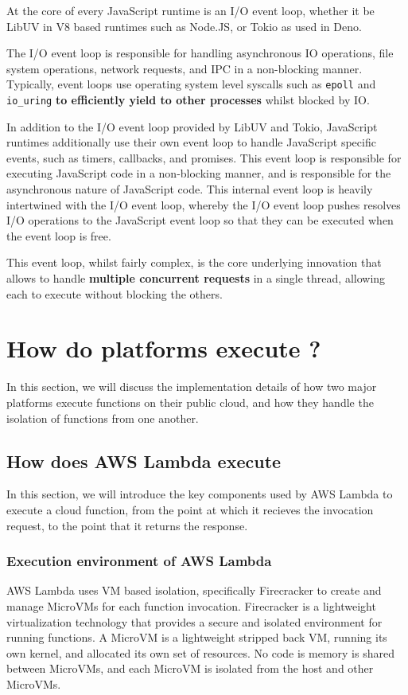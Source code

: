 At the core of every JavaScript runtime is an I/O event loop, whether it be LibUV\cite{LibuvCrossplatformAsynchronous, DesignOverviewLibuv} in V8\cite{googleWhatV82024} based runtimes such as Node.JS\cite{foundationNodeJS2024}, or Tokio\cite{TokioAsynchronousRust} as used in Deno\cite{incDeno2024}.

The I/O event loop is responsible for handling asynchronous IO operations, file system operations, network requests, and IPC in a non-blocking manner. Typically, event loops use operating system level syscalls such as \verb|epoll| and \verb|io_uring| \textbf{to efficiently yield to other processes} whilst blocked by IO.

In addition to the I/O event loop provided by LibUV and Tokio, JavaScript runtimes additionally use their own event loop to handle JavaScript specific events, such as timers, callbacks, and promises. This event loop is responsible for executing JavaScript code in a non-blocking manner, and is responsible for the asynchronous nature of JavaScript code. This internal event loop is heavily intertwined with the I/O event loop, whereby the I/O event loop pushes resolves I/O operations to the JavaScript event loop so that they can be executed when the event loop is free.

This event loop, whilst fairly complex, is the core underlying innovation that allows \js{} to handle \textbf{multiple concurrent requests} in a single thread, allowing each to execute without blocking the others.

\section{How do \faas{} platforms execute \faaslong{}?}
In this section, we will discuss the implementation details of how two major \faas{} platforms execute \faas{} functions on their public cloud, and how they handle the isolation of functions from one another.

\subsection{How does AWS Lambda execute \faaslong{}}
\label{sec:aws-lambda-execution}
In this section, we will introduce the key components used by AWS Lambda to execute a cloud function, from the point at which it recieves the invocation request, to the point that it returns the response.

\subsubsection{Execution environment of AWS Lambda}
\label{sec:aws-lambda-execution-environment}
AWS Lambda uses VM based isolation, specifically Firecracker\cite{agacheFirecrackerLightweightVirtualization2020} to create and manage MicroVMs for each function invocation. Firecracker is a lightweight virtualization technology that provides a secure and isolated environment for running functions. A MicroVM is a lightweight stripped back VM, running its own kernel, and allocated its own set of resources. No code is memory is shared between MicroVMs, and each MicroVM is isolated from the host and other MicroVMs.


